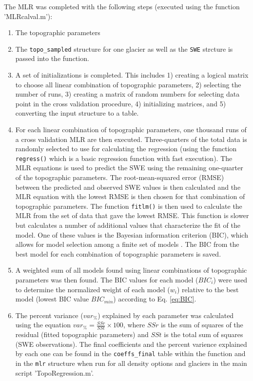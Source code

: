 \documentclass[12pt]{article}
\begin{document}
The MLR was completed with the following steps (executed using the function 'MLRcalval.m'):
\begin{enumerate}
\item The topographic parameters 

\item The \texttt{topo\_sampled} structure for one glacier as well as the \texttt{SWE} strcture is passed into the function.

\item A set of initializations is completed. This includes 1) creating a logical matrix to choose all linear combination of topographic parameters, 2) selecting the number of runs, 3) creating a matrix of random numbers for selecting data point in the cross validation procedure, 4) initializing matrices, and 5) converting the input structure to a table.

\item For each linear combination of topographic parameters, one thousand runs of a cross validation MLR are then executed. Three-quarters of the total data is randomly selected to use for calculating the regression (using the function \texttt{regress()} which is a basic regression function with fast execution). The MLR equations is used to predict the SWE using the remaining one-quarter of the topographic parameters. The root-mean-squared error (RMSE) between the predicted and observed SWE values is then calculated and the MLR equation with the lowest RMSE is then chosen for that combination of topographic parameters. The function \texttt{fitlm()} is then used to calculate the MLR from the set of data that gave the lowest RMSE. This function is slower but calculates a number of additional values that characterize the fit of the model. One of these values is the Bayesian information criterion (BIC), which allows for model selection among a finite set of models \citep{Burnham2004}. The BIC from the best model for each combination of topographic parameters is saved.

\item A weighted sum of all models found using linear combinations of topographic parameters was then found. The BIC values for each model ($BIC_i$) were used to determine the normalized weight of each model ($w_i$) relative to the best model (lowest BIC value $BIC_{min}$) according to Eq. \ref{eq:BIC}.

\item The percent variance ($var_\%$) explained by each parameter was calculated using the equation $var_\% = \frac{SSr}{SSt}\times 100$, where $SSr$ is the sum of squares of the residual (fitted topographic parameters) and $SSt$ is the total sum of squares (SWE observations). The final coefficients and the percent varience explained by each one can be found in the \texttt{coeffs\_final} table within the function and in the \texttt{mlr} structure when run for all density options and glaciers in the main script 'TopoRegression.m'.


\end{enumerate}
\end{document}
